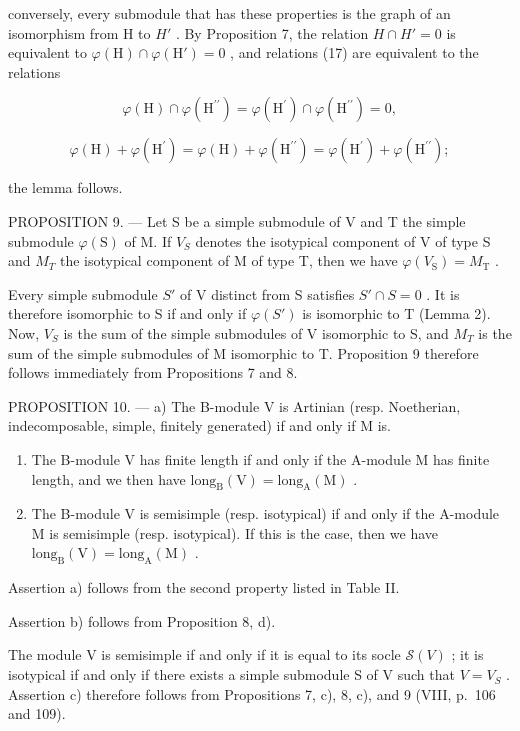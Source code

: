 conversely, every submodule that has these properties is the graph of an isomorphism from H to \(H'\) . By Proposition 7, the relation \(H \cap H' = 0\) is equivalent to \(\varphi(\mathrm{H}) \cap \varphi(\mathrm{H}') = 0\) , and relations (17) are equivalent to the relations

\[
\varphi (\mathrm{H}) \cap \varphi (\mathrm{H} ^ {\prime \prime}) = \varphi (\mathrm{H} ^ {\prime}) \cap \varphi (\mathrm{H} ^ {\prime \prime}) = 0,
\]

\[
\varphi (\mathrm{H}) + \varphi (\mathrm{H} ^ {\prime}) = \varphi (\mathrm{H}) + \varphi (\mathrm{H} ^ {\prime \prime}) = \varphi (\mathrm{H} ^ {\prime}) + \varphi (\mathrm{H} ^ {\prime \prime});
\]

the lemma follows.

PROPOSITION 9. --- Let S be a simple submodule of V and T the simple submodule \(\varphi(\mathrm{S})\) of M. If \(V_{S}\) denotes the isotypical component of V of type S and \(M_{T}\) the isotypical component of M of type T, then we have \(\varphi(V_{\mathrm{S}})=M_{\mathrm{T}}\) .

Every simple submodule \(S'\) of V distinct from S satisfies \(S' \cap S = 0\) . It is therefore isomorphic to S if and only if \(\varphi(S')\) is isomorphic to T (Lemma 2). Now, \(V_{S}\) is the sum of the simple submodules of V isomorphic to S, and \(M_{T}\) is the sum of the simple submodules of M isomorphic to T. Proposition 9 therefore follows immediately from Propositions 7 and 8.

PROPOSITION 10. --- a) The B-module V is Artinian (resp. Noetherian, indecomposable, simple, finitely generated) if and only if M is.

\begin{enumerate}
\def\labelenumi{\alph{enumi})}
\setcounter{enumi}{1}
\item
  The B-module V has finite length if and only if the A-module M has finite length, and we then have \(\mathrm{long}_{\mathrm{B}}(\mathrm{V}) = \mathrm{long}_{\mathrm{A}}(\mathrm{M})\) .
\item
  The B-module V is semisimple (resp. isotypical) if and only if the A-module M is semisimple (resp. isotypical). If this is the case, then we have \(\text{long}_{\text{B}}(\text{V}) = \text{long}_{\text{A}}(\text{M})\) .
\end{enumerate}

Assertion a) follows from the second property listed in Table II.

Assertion b) follows from Proposition 8, d).

The module V is semisimple if and only if it is equal to its socle \(\mathcal{S}(V)\) ; it is isotypical if and only if there exists a simple submodule S of V such that \(V = V_{S}\) . Assertion c) therefore follows from Propositions 7, c), 8, c), and 9 (VIII, p.~106 and 109).

